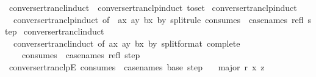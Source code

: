 \begin{isabellebody}
\endisatagproof
{\isafoldproof}%
%
\isadelimproof
\isanewline
%
\endisadelimproof
\isanewline
{}\isamarkupfalse%
\ converse{\isacharunderscore}{\kern0pt}rtrancl{\isacharunderscore}{\kern0pt}induct\ {\isacharequal}{\kern0pt}\ converse{\isacharunderscore}{\kern0pt}rtranclp{\isacharunderscore}{\kern0pt}induct\ {\isacharbrackleft}{\kern0pt}to{\isacharunderscore}{\kern0pt}set{\isacharbrackright}{\kern0pt}\isanewline
\isanewline
{}\isamarkupfalse%
\ converse{\isacharunderscore}{\kern0pt}rtranclp{\isacharunderscore}{\kern0pt}induct{}\ {\isacharequal}{\kern0pt}\isanewline
\ \ converse{\isacharunderscore}{\kern0pt}rtranclp{\isacharunderscore}{\kern0pt}induct\ {\isacharbrackleft}{\kern0pt}of\ {\isacharunderscore}{\kern0pt}\ {\isachardoublequoteopen}{\isacharparenleft}{\kern0pt}ax{\isacharcomma}{\kern0pt}\ ay{\isacharparenright}{\kern0pt}{\isachardoublequoteclose}\ {\isachardoublequoteopen}{\isacharparenleft}{\kern0pt}bx{\isacharcomma}{\kern0pt}\ by{\isacharparenright}{\kern0pt}{\isachardoublequoteclose}{\isacharcomma}{\kern0pt}\ split{\isacharunderscore}{\kern0pt}rule{\isacharcomma}{\kern0pt}\ consumes\ {}{\isacharcomma}{\kern0pt}\ case{\isacharunderscore}{\kern0pt}names\ refl\ step{\isacharbrackright}{\kern0pt}\isanewline
\isanewline
{}\isamarkupfalse%
\ converse{\isacharunderscore}{\kern0pt}rtrancl{\isacharunderscore}{\kern0pt}induct{}\ {\isacharequal}{\kern0pt}\isanewline
\ \ converse{\isacharunderscore}{\kern0pt}rtrancl{\isacharunderscore}{\kern0pt}induct\ {\isacharbrackleft}{\kern0pt}of\ {\isachardoublequoteopen}{\isacharparenleft}{\kern0pt}ax{\isacharcomma}{\kern0pt}\ ay{\isacharparenright}{\kern0pt}{\isachardoublequoteclose}\ {\isachardoublequoteopen}{\isacharparenleft}{\kern0pt}bx{\isacharcomma}{\kern0pt}\ by{\isacharparenright}{\kern0pt}{\isachardoublequoteclose}{\isacharcomma}{\kern0pt}\ split{\isacharunderscore}{\kern0pt}format\ {\isacharparenleft}{\kern0pt}complete{\isacharparenright}{\kern0pt}{\isacharcomma}{\kern0pt}\isanewline
\ \ \ \ consumes\ {}{\isacharcomma}{\kern0pt}\ case{\isacharunderscore}{\kern0pt}names\ refl\ step{\isacharbrackright}{\kern0pt}\isanewline
\isanewline
{}\isamarkupfalse%
\ converse{\isacharunderscore}{\kern0pt}rtranclpE\ {\isacharbrackleft}{\kern0pt}consumes\ {}{\isacharcomma}{\kern0pt}\ case{\isacharunderscore}{\kern0pt}names\ base\ step{\isacharbrackright}{\kern0pt}{\isacharcolon}{\kern0pt}\isanewline
\ \ \ major{\isacharcolon}{\kern0pt}\ {\isachardoublequoteopen}r\isactrlsup {\isacharasterisk}{\kern0pt}\isactrlsup {\isacharasterisk}{\kern0pt}\ x\ z{\isachardoublequoteclose}\isanewline

\end{isabellebody}
